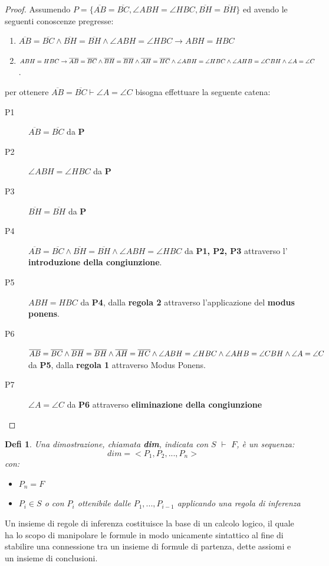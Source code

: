 \documentclass[a4paper]{book}
\newtheorem*{defi}{Defi}%
\begin{document}
\begin{proof}
Assumendo $P = \{ \overline{AB} = \overline{BC}, \angle ABH = \angle HBC, \overline{BH} = \overline{BH} \}$
ed avendo le seguenti conoscenze pregresse:
\begin{enumerate}
\item $\overline{AB}=\overline{BC} \land \overline{BH}=\overline{BH} \land \angle ABH = \angle HBC \rightarrow  ABH = HBC$
\item $ABH = HBC \rightarrow \overline{AB}=\overline{BC} \land \overline{BH}=\overline{BH} \land \overline{AH}=\overline{HC}
        \land \newline \angle ABH = \angle HBC \land \angle AHB = \angle CBH \land \angle A=\angle C$.
\end{enumerate}
per ottenere $\overline{AB} = \overline{BC} \vdash \angle A = \angle C$ bisogna effettuare la seguente catena:
\begin{description}
\item [P1] $\overline{AB}=\overline{BC}$  da \textbf{P}
\item [P2] $\angle ABH = \angle HBC$  da \textbf{P}
\item [P3] $\overline{BH}=\overline{BH}$  da \textbf{P}
\item [P4] $\overline{AB} = \overline{BC} \land \overline{BH} = \overline{BH} \land \angle ABH = \angle HBC$
       da \textbf{P1, P2, P3} attraverso l' \textbf{introduzione della congiunzione}.
\item [P5] $ABH = HBC$ da \textbf{P4}, dalla \textbf{regola 2}  attraverso l'applicazione del \textbf{modus ponens}.
\item [P6] $\overline{AB} = \overline{BC} \land \overline{BH} = \overline{BH} \land \overline{AH} = \overline{HC} \land \newline
  \angle ABH = \angle HBC \land \angle AHB = \angle CBH \land \angle A=\angle C$ da \textbf{P5}, dalla \textbf{regola 1} attraverso Modus Ponens.
\item [P7] $\angle A=\angle C$ da \textbf{P6} attraverso \textbf{eliminazione della congiunzione}
\end{description}
\end{proof}
\begin{defi}
  Una dimostrazione, chiamata \textbf{dim}, indicata con $S\,\,\vdash\,\, F$, è un sequenza:
\begin{equation*}
  dim=<P_1,P_2,...,P_n>
\end{equation*}
con:
\begin{itemize}
\item $P_n=F$
\item $P_i \in S$ o con $P_i$ ottenibile dalle $P_1,...,P_{i-1}$ applicando una regola di inferenza
\end{itemize}
\end{defi}
Un insieme di regole di inferenza costituisce la base di un calcolo logico, il quale ha lo scopo di manipolare le formule in modo
unicamente sintattico al fine di stabilire una connessione tra un insieme di formule di partenza, dette assiomi e un insieme di conclusioni.
\end{document}
